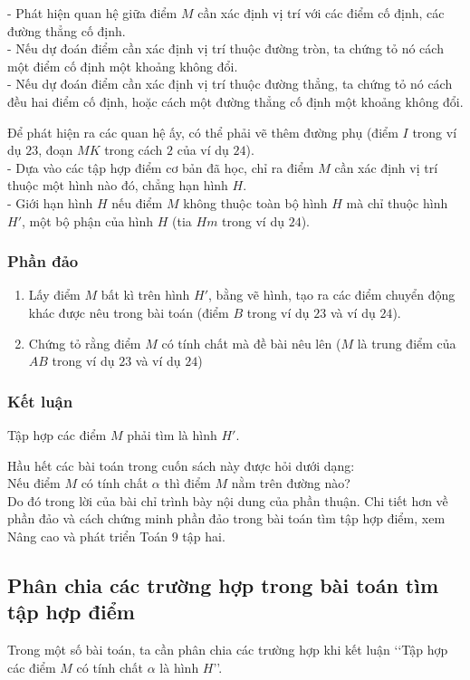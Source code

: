 	- Phát hiện quan hệ giữa điểm $M$ cần xác định vị trí với các điểm cố định, các đường thẳng cố định. \\
	- Nếu dự đoán điểm cần xác định vị trí thuộc đường tròn, ta chứng tỏ nó cách một điểm cố định một khoảng không đổi. \\
	- Nếu dự đoán điểm cần xác định vị trí thuộc đường thẳng, ta chứng tỏ nó cách đều hai điểm cố định, hoặc cách một đường thẳng cố định một khoảng không đổi.\\

\begin{note}
	Để phát hiện ra các quan hệ ấy, có thể phải vẽ thêm đường phụ (điểm $I$ trong ví dụ $23$, đoạn $MK$ trong cách $2$ của ví dụ $24$).\\
	- Dựa vào các tập hợp điểm cơ bản đã học, chỉ ra điểm $M$ cần xác định vị trí thuộc một hình nào đó, chẳng hạn hình $H$.\\
	- Giới hạn hình $H$ nếu điểm $M$ không thuộc toàn bộ hình $H$ mà chỉ thuộc hình $H'$, một bộ phận của hình $H$ (tia $Hm$ trong ví dụ $24$).
\end{note}
\subsubsection{Phần đảo}
\begin{enumerate}
	\item  Lấy điểm $M$ bất kì trên hình $H'$, bằng vẽ hình, tạo ra các điểm chuyển động khác được nêu trong bài toán (điểm $B$ trong ví dụ $23$ và ví dụ $24$).
	\item Chứng tỏ rằng điểm $M$ có tính chất mà đề bài nêu lên ($M$ là trung điểm của $AB$ trong ví dụ $23$ và ví dụ $24$)
\end{enumerate}	
\subsubsection{Kết luận}
	Tập hợp các điểm $M$ phải tìm là hình $H'$.
\begin{note}
	Hầu hết các bài toán trong cuốn sách này được hỏi dưới dạng:\\
	Nếu điểm $M$ có tính chất $\alpha$ thì điểm $M$ nằm trên đường nào? \\
	Do đó trong lời của bài chỉ trình bày nội dung của phần thuận. Chi tiết hơn về phần đảo và cách chứng minh phần đảo trong bài toán tìm tập hợp điểm, xem Nâng cao và phát triển Toán $9$ tập hai.
\end{note}

\subsection{Phân chia các trường hợp trong bài toán tìm tập hợp điểm}
Trong một số bài toán, ta cần phân chia các trường hợp khi kết luận \lq\lq Tập hợp các điểm $M$ có tính chất $\alpha$ là hình $H$\rq\rq.

